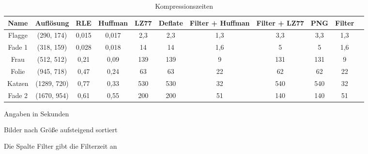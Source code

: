 \documentclass[conference]{IEEEtran}
\begin{document}
\begin{table}[ht]
  \renewcommand*{\arraystretch}{1.1}
  \centering
  \begin{threeparttable}
    \caption{Kompressionszeiten}
    \begin{tabular}{c *9{c} S[table-format=5.9]}
      \toprule
      Name   & Auflösung   & RLE   & Huffman & LZ77 & Deflate & Filter + Huffman & Filter + LZ77 & PNG & Filter \\
      \midrule
      Flagge & (290, 174)  & 0,015 & 0,017   & 2,3  & 2,3     & 1,3              & 3,3           & 3,3 & 1,3    \\
      Fade 1 & (318, 159)  & 0,028 & 0,018   & 14   & 14      & 1,6              & 5             & 5   & 1,6    \\
      Frau   & (512, 512)  & 0,21  & 0,09    & 139  & 139     & 9                & 131           & 131 & 9      \\
      Folie  & (945, 718)  & 0,47  & 0,24    & 63   & 63      & 22               & 62            & 62  & 22     \\
      Katzen & (1289, 720) & 0,77  & 0,33    & 530  & 530     & 32               & 540           & 540 & 32     \\
      Fade 2 & (1670, 954) & 0,61  & 0,55    & 200  & 200     & 51               & 140           & 140 & 51
    \end{tabular}
    \par{} Angaben in Sekunden
    \par{} Bilder nach Größe aufsteigend sortiert
    \par{} Die Spalte Filter gibt die Filterzeit an
    \label{tab:kompzeiten}
  \end{threeparttable}
\end{table}
\end{document}
